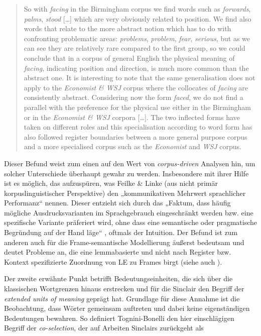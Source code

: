\begin{quote}
So with \emph{facing} in the Birmingham corpus we find words such as \emph{forwards}, \emph{palms}, \emph{stood} {[}\ldots{]} which are very obviously related to position. We find also words that relate to the more abstract notion which has to do with confronting problematic areas: \emph{problems}, \emph{problem}, \emph{fear}, \emph{serious}, but as we can see they are relatively rare compared to the first group, so we could conclude that in a corpus of general English the physical meaning of \emph{facing}, indicating position and direction, is much more common than the abstract one. It is interesting to note that the same generalisation does not apply to the \emph{Economist \& WSJ} corpus where the collocates of \emph{facing} are consistently abstract. Considering now the form \emph{faced}, we do not find a parallel with the preference for the physical use either in the Birmingham or in the \emph{Economist \& WSJ} corpora {[}\ldots{]}. The two inflected forms have taken on different roles and this specialisation according to word form has also followed register boundaries between a more general purpose corpus and a more specialised corpus such as the \emph{Economist} and \emph{WSJ} corpus. \autocite[95]{tognini-bonelliCorpusLinguisticsWork2001}
\end{quote}

Dieser Befund weist zum einen auf den Wert von \emph{corpus-driven} Analysen hin, um solcher Unterschiede überhaupt gewahr zu werden. Insbesondere mit ihrer Hilfe ist es möglich, das aufzuspüren, was Feilke \& Linke (aus nicht primär korpuslinguistischer Perspektive) den „kommunikativen Mehrwert sprachlicher Performanz`` nennen. Dieser entzieht sich durch das „Faktum, dass häufig mögliche Ausdrucksvarianten im Sprachgebrauch eingeschränkt werden bzw. eine spezifische Variante präferiert wird, ohne dass eine semantische oder pragmatische Begründung auf der Hand läge`` \autocite[5-6]{feilkeOberflaecheUndPerformanz2009}, oftmals der Intuition. Der Befund ist zum anderen auch für die Frame-semantische Modellierung äußerst bedeutsam und deutet Probleme an, die eine lemmabasierte und nicht nach Register bzw. Kontext spezifizierte Zuordnung von LE zu Frames birgt (siehe auch ).

Der zweite erwähnte Punkt betrifft Bedeutungseinheiten, die sich über die klassischen Wortgrenzen hinaus erstrecken und für die Sinclair \autocite*{sinclairUnitsMeaning1996} den Begriff der \emph{extended units of meaning} geprägt hat. Grundlage für diese Annahme ist die Beobachtung, dass Wörter gemeinsam auftreten und dabei keine eigenständigen Bedeutungen bewahren. So definiert Tognini-Bonelli den hier einschlägigen Begriff der \emph{co-selection}, der auf Arbeiten Sinclairs zurückgeht als


